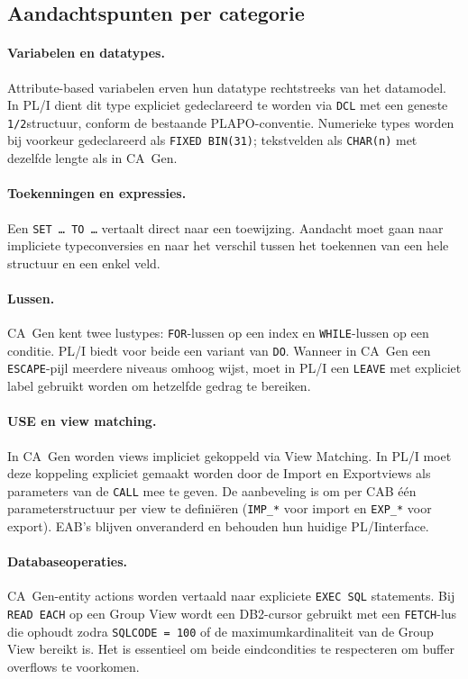 \subsection{Aandachtspunten per categorie}
\label{subsec:aandachtspunten}

\paragraph{Variabelen en datatypes.} Attribute-based variabelen erven hun datatype rechtstreeks van het 
datamodel. In PL/I dient dit type expliciet gedeclareerd te worden via \texttt{DCL} met een geneste 
\texttt{1/2}\-structuur, conform de bestaande PLAPO-conventie. Numerieke types worden bij voorkeur 
gedeclareerd als \texttt{FIXED BIN(31)}; tekstvelden als \texttt{CHAR(n)} met dezelfde lengte als in CA~Gen.

\paragraph{Toekenningen en expressies.} Een \texttt{SET~\dots~TO~\dots} vertaalt direct naar een 
toewijzing. Aandacht moet gaan naar impliciete typeconversies en naar het verschil tussen het toekennen 
van een hele structuur en een enkel veld.

\paragraph{Lussen.} CA~Gen kent twee lustypes: \texttt{FOR}-lussen op een index en \texttt{WHILE}-lussen 
op een conditie. PL/I biedt voor beide een variant van \texttt{DO}. Wanneer in CA~Gen een 
\texttt{ESCAPE}-pijl meerdere niveaus omhoog wijst, moet in PL/I een \texttt{LEAVE} met expliciet label 
gebruikt worden om hetzelfde gedrag te bereiken.

\paragraph{USE en view matching.} In CA~Gen worden views impliciet gekoppeld via View Matching. In PL/I 
moet deze koppeling expliciet gemaakt worden door de Import\- en Export\-views als parameters van de 
\texttt{CALL} mee te geven. De aanbeveling is om per CAB één parameterstructuur per view te definiëren 
(\texttt{IMP\_*} voor import en \texttt{EXP\_*} voor export). EAB's blijven onveranderd en behouden hun 
huidige PL/I\-interface.

\paragraph{Database\-operaties.} CA~Gen-entity actions worden vertaald naar expliciete \texttt{EXEC SQL}\-
statements. Bij \texttt{READ EACH} op een Group View wordt een DB2-cursor gebruikt met een 
\texttt{FETCH}-lus die ophoudt zodra \texttt{SQLCODE = 100} of de maximumkardinaliteit van de Group View 
bereikt is. Het is essentieel om beide eindcondities te respecteren om buffer overflows te voorkomen.

